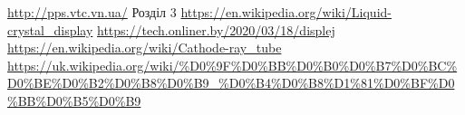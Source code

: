 \documentclass[a4paper]{article}
\begin{document}
\begin{thebibliography}{4}
{\small
{} \url{http://pps.vtc.vn.ua/} Розділ 3
}
{\small
{} \url{https://en.wikipedia.org/wiki/Liquid-crystal_display}
}
{\small
{} \url{https://tech.onliner.by/2020/03/18/displej}
}
{\small
{} \url{https://en.wikipedia.org/wiki/Cathode-ray_tube}
}
{\small
{} \url{https://uk.wikipedia.org/wiki/%D0%9F%D0%BB%D0%B0%D0%B7%D0%BC%D0%BE%D0%B2%D0%B8%D0%B9_%D0%B4%D0%B8%D1%81%D0%BF%D0%BB%D0%B5%D0%B9}
}
\end{thebibliography}
\end{document}

